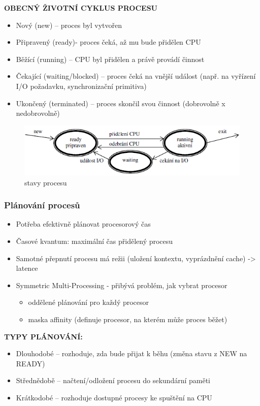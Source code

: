 \documentclass[10pt,a4paper]{article}
\begin{document}
\textbf{OBECNÝ ŽIVOTNÍ CYKLUS PROCESU}
\begin{itemize}
	\item Nový (new) – proces byl vytvořen
	\item Připravený (ready)- proces čeká, až mu bude přidělen CPU
	\item Běžící (running) – CPU byl přidělen a právě provádí činnost
	\item Čekající (waiting/blocked) – proces čeká na vnější událost (např. na vyřízení I/O požadavku, synchronizační primitiva)
	\item Ukončený (terminated) – proces skončil svou činnost (dobrovolně x nedobrovolně)
\end{itemize}

\begin{figure} [h]
		\includegraphics[scale=0.85]{img/stavy_procesu.png}
		\caption{stavy procesu}	
\end{figure}

\subsubsection{Plánování procesů}
\begin{itemize}
	\item Potřeba efektivně plánovat procesorový čas
	\item Časové kvantum: maximální čas přidělený procesu
	\item Samotné přepnutí procesu má režii (uložení kontextu, vyprázdnění cache) -> latence
	\item Symmetric Multi-Processing - přibývá problém, jak vybrat procesor
	\begin{itemize}
		\item oddělené plánování pro každý procesor
		\item maska affinity (definuje procesor, na kterém může proces běžet)
	\end{itemize}
\end{itemize}

\textbf{TYPY PLÁNOVÁNÍ:}
\begin{itemize}
	\item Dlouhodobé – rozhoduje, zda bude přijat k běhu (změna stavu z NEW na READY)
	\item Střednědobě – načtení/odložení procesu do sekundární paměti
	\item Krátkodobé – rozhoduje dostupné procesy ke spuštění na CPU
\end{itemize}
\end{document}
